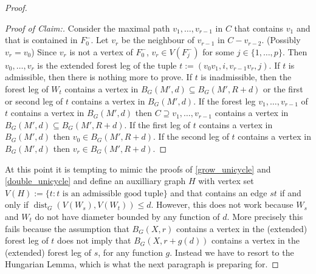 \documentclass{patmorin}
\newenvironment{clmproof}{\begin{proof}[Proof of Claim:]\renewcommand{\qedsymbol}{\rule{1ex}{1ex}}}{\end{proof}}
\DeclareMathOperator{\dist}{dist}
\begin{document}
\begin{proof}
\begin{clmproof}
  Consider the maximal path $v_1,\ldots,v_{r-1}$ in $C$ that contains $v_1$ and that is contained in $F_0^-$. Let $v_r$ be the neighbour of $v_{r-1}$ in $C-v_{r-2}$.  (Possibly $v_r=v_0$)  Since $v_r$ is not a vertex of $F_0^-$, $v_r\in V(F^-_j)$ for some $j\in\{1,\ldots,p\}$.  Then $v_0,\ldots,v_{r}$ is the extended forest leg of the tuple $t:=(v_0v_1,i,v_{r-1}v_r,j)$.   If $t$ is admissible, then there is nothing more to prove.  If $t$ is inadmissible, then the forest leg of $W_t$ contains a vertex in $B_G(M',d)\subseteq B_G(M',R+d)$ or the first or second leg of $t$ contains a vertex in $B_G(M',d)$.  If the forest leg $v_1,\ldots,v_{r-1}$ of $t$ contains a vertex in $B_G(M',d)$ then $C\supseteq v_1,\ldots,v_{r-1}$ contains a vertex in $B_G(M',d)\subseteq B_G(M',R+d)$.  If the first leg of $t$ contains a vertex in $B_G(M',d)$ then $v_0\in B_G(M',R+d)$.  If the second leg of $t$ contains a vertex in $B_G(M',d)$ then $v_r\in B_G(M',R+d)$.
\end{clmproof}

At this point it is tempting to mimic the proofs of \cref{grow_unicycle} and \cref{double_unicycle} and define an auxilliary graph $H$ with vertex set $V(H):=\{t:\textrm{$t$ is an admissible good tuple}\}$ and that contains an edge $st$ if and only if $\dist_G(V(W_s),V(W_t))\le d$. However, this does not work because $W_s$ and $W_t$ do not have diameter bounded by any function of $d$.  More precisely this fails because the assumption that $B_G(X,r)$ contains a vertex in the (extended) forest leg of $t$ does not imply that $B_G(X,r+g(d))$ contains a vertex in the (extended) forest leg of $s$, for any function $g$.  Instead we have to resort to the Hungarian Lemma, which is what the next paragraph is preparing for.





\end{proof}
\end{document}
